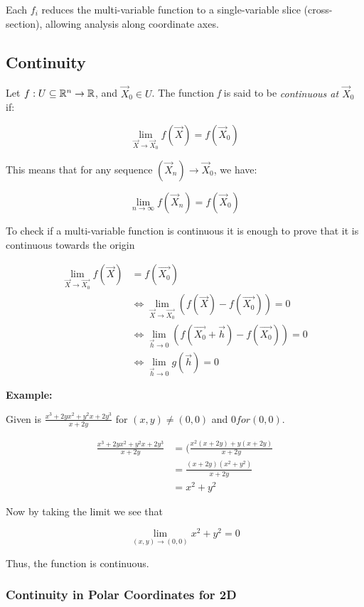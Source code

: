 Each \( f_i \) reduces the multi-variable function to a single-variable slice (cross-section), 
allowing analysis along coordinate axes.


\subsection{Continuity}

Let \( f : U \subseteq \mathbb{R}^n \to \mathbb{R} \), and \( \vec{X}_0 \in U \). The function 
\emph{f} is said to be \emph{continuous at \( \vec{X}_0 \)} if:

\[
    \lim_{\vec{X} \to \vec{X}_0} f(\vec{X}) = f(\vec{X}_0)
\]

This means that for any sequence \( (\vec{X}_n) \to \vec{X}_0 \), we have:

\[
    \lim_{n \to \infty} f(\vec{X}_n) = f(\vec{X}_0)
\]

To check if a multi-variable function is continuous it is enough to prove that it is continuous towards 
the origin

\begin{align*}
    \lim_{\vec{X} \to \vec{X_0}}f(\vec{X}) &= f(\vec{X_0}) \\
    &\iff \lim_{\vec{X} \to \vec{X_0}} \left(f(\vec{X}) - f(\vec{X_0})\right) = 0 \\
    &\iff \lim_{\vec{h} \to 0} \left(f(\vec{X_0} + \vec{h}) - f(\vec{X_0})\right) = 0 \\
    &\iff \lim_{\vec{h} \to 0} g(\vec{h}) = 0
\end{align*}

\textbf{Example:}
\vspace{\baselineskip}

Given is \(\frac{x^3 + 2yx^2 + y^2x + 2y^3}{x + 2y}\) for \((x,y) \ne (0,0)\) and \(0 for (0,0)\).

\begin{align*}
    \frac{x^3 + 2yx^2 + y^2x + 2y^3}{x + 2y} &= (\frac{x^2(x + 2y) + y(x + 2y)}{x + 2y}\\
    &= \frac{(x + 2y)(x^2 + y^2)}{x + 2y}\\
    &= x^2 + y^2
\end{align*}

Now by taking the limit we see that

\[
    \lim_{(x,y) \to (0,0)} x^2 + y^2 = 0
\]

Thus, the function is continuous.


\subsubsection{Continuity in Polar Coordinates for 2D}

